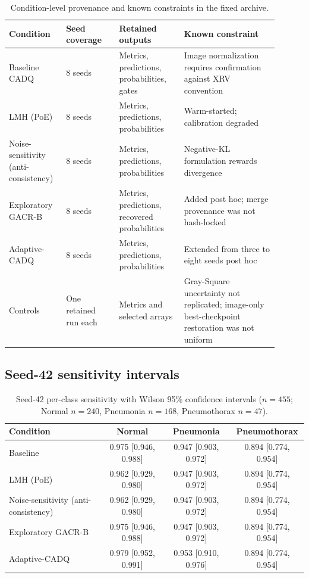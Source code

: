 \documentclass[a4paper,fleqn]{cas-sc}
\begin{document}
\begin{table}[pos=H]
\centering
\caption{Condition-level provenance and known constraints in the fixed archive.}
\label{tab:s-provenance}
\scriptsize
\begin{tabular}{p{0.18\linewidth}p{0.18\linewidth}p{0.22\linewidth}p{0.32\linewidth}}
\toprule
Condition & Seed coverage & Retained outputs & Known constraint \\
\midrule
Baseline CADQ & 8 seeds & Metrics, predictions, probabilities, gates & Image normalization requires confirmation against XRV convention \\
LMH (PoE) & 8 seeds & Metrics, predictions, probabilities & Warm-started; calibration degraded \\
Noise-sensitivity (anti-consistency) & 8 seeds & Metrics, predictions, probabilities & Negative-KL formulation rewards divergence \\
Exploratory GACR-B & 8 seeds & Metrics, predictions, recovered probabilities & Added post hoc; merge provenance was not hash-locked \\
Adaptive-CADQ & 8 seeds & Metrics, predictions, probabilities & Extended from three to eight seeds post hoc \\
Controls & One retained run each & Metrics and selected arrays & Gray-Square uncertainty not replicated; image-only best-checkpoint restoration was not uniform \\
\bottomrule
\end{tabular}
\end{table}

\subsection{Seed-42 sensitivity intervals}

\begin{table}[pos=H]
\centering
\caption{Seed-42 per-class sensitivity with Wilson 95\% confidence intervals
($n=455$; Normal $n=240$, Pneumonia $n=168$, Pneumothorax $n=47$).}
\label{tab:s-wilson}
\scriptsize
\begin{tabular}{lccc}
\toprule
Condition & Normal & Pneumonia & Pneumothorax \\
\midrule
Baseline & 0.975 [0.946, 0.988] & 0.947 [0.903, 0.972] & 0.894 [0.774, 0.954] \\
LMH (PoE) & 0.962 [0.929, 0.980] & 0.947 [0.903, 0.972] & 0.894 [0.774, 0.954] \\
Noise-sensitivity (anti-consistency) & 0.962 [0.929, 0.980] & 0.947 [0.903, 0.972] & 0.894 [0.774, 0.954] \\
Exploratory GACR-B & 0.975 [0.946, 0.988] & 0.947 [0.903, 0.972] & 0.894 [0.774, 0.954] \\
Adaptive-CADQ & 0.979 [0.952, 0.991] & 0.953 [0.910, 0.976] & 0.894 [0.774, 0.954] \\
\bottomrule
\end{tabular}
\end{table}
\end{document}
